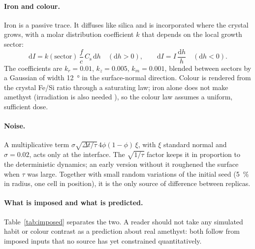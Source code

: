 \documentclass[11pt,a4paper]{article}
\begin{document}
\paragraph{Iron and colour.} Iron is a passive trace. It diffuses like silica and is incorporated where the crystal grows, with a molar distribution coefficient $k$ that depends on the local growth sector:
\begin{equation}\label{eq:iron}
  \mathrm dI = k(\text{sector})\,\frac{f}{c}\,C_\mathrm{s}\,\mathrm dh \quad(\mathrm dh>0),
  \qquad
  \mathrm dI = I\,\frac{\mathrm dh}{h}\quad(\mathrm dh<0).
\end{equation}
The coefficients are $k_r=0.01$, $k_z=0.005$, $k_m=0.001$, blended between sectors by a Gaussian of width \SI{12}{\degree} in the surface-normal direction. Colour is rendered from the crystal Fe/Si ratio through a saturating law; iron alone does not make amethyst (irradiation is also needed \citep{Cohen1974}), so the colour law assumes a uniform, sufficient dose.

\paragraph{Noise.} A multiplicative term $\sigma\sqrt{\Delta t/\tau}\,4\phi(1-\phi)\,\xi$, with $\xi$ standard normal and $\sigma=0.02$, acts only at the interface. The $\sqrt{1/\tau}$ factor keeps it in proportion to the deterministic dynamics; an early version without it roughened the surface when $\tau$ was large. Together with small random variations of the initial seed (\SI{5}{\percent} in radius, one cell in position), it is the only source of difference between replicas.

\paragraph{What is imposed and what is predicted.} Table~\ref{tab:imposed} separates the two. A reader should not take any simulated habit or colour contrast as a prediction about real amethyst: both follow from imposed inputs that no source has yet constrained quantitatively.
\end{document}
